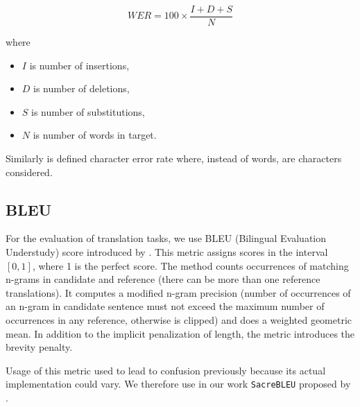\begin{equation}
WER = 100 \times \frac{I + D + S}{N}
\end{equation}

where

\begin{itemize}
	\item $I$ is number of insertions,
	\item $D$ is number of deletions,
	\item $S$ is number of substitutions,
	\item $N$ is number of words in target.
\end{itemize}

Similarly is defined character error rate where, instead of words, are characters considered.

\subsection{BLEU}
For the evaluation of translation tasks, we use BLEU (Bilingual Evaluation Understudy) score introduced by . This metric assigns scores in the interval $[0,1]$, where 1 is the perfect score. The method counts occurrences of matching n-grams in candidate and reference (there can be more than one reference translations). It computes a modified n-gram precision (number of occurrences of an n-gram in candidate sentence must not exceed the maximum number of occurrences in any reference, otherwise is clipped) and does a weighted geometric mean. In addition to the implicit penalization of length, the metric introduces the brevity penalty.

Usage of this metric used to lead to confusion previously because its actual implementation could vary. We therefore use in our work \texttt{SacreBLEU} proposed by .
